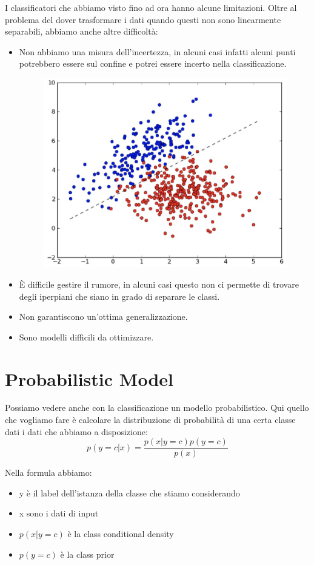 \documentclass[14pt]{extreport}
\begin{document}
I classificatori che abbiamo visto fino ad ora hanno alcune limitazioni. Oltre al problema del dover trasformare i dati quando questi non sono
linearmente separabili, abbiamo anche altre difficoltà:

\begin{itemize}
	\item Non abbiamo una misura dell'incertezza, in alcuni casi infatti alcuni punti potrebbero essere sul confine e potrei essere incerto nella
	classificazione.\begin{figure}[H]
		      \centering
		      \includegraphics[width=0.4\linewidth]{156.jpeg}
	      \end{figure}
	\item È difficile gestire il rumore, in alcuni casi questo non ci permette di trovare degli iperpiani che siano in grado di separare le classi.
	\item Non garantiscono un'ottima generalizzazione.
	\item Sono modelli difficili da ottimizzare.
\end{itemize}

\section{Probabilistic Model}

Possiamo vedere anche con la classificazione un modello probabilistico. Qui quello che vogliamo fare è calcolare la distribuzione di probabilità di
una certa classe dati i dati che abbiamo a disposizione:
$$p(y=c|x) = \frac{p(x | y=c)p(y=c)}{p(x)}$$

Nella formula abbiamo:
\begin{itemize}
	\item y è il label dell'istanza della classe che stiamo considerando
	\item x sono i dati di input
	\item $p(x|y=c)$ è la class conditional density
	\item $p(y=c)$ è la class prior
\end{itemize}
\end{document}
